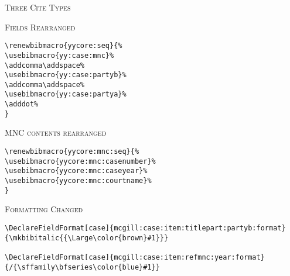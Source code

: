 %
%


\bigskip\textsc{Three Cite Types}




\bigskip\textsc{Fields Rearranged}


\begin{verbatim}
\renewbibmacro{yycore:seq}{%
\usebibmacro{yy:case:mnc}%
\addcomma\addspace%
\usebibmacro{yy:case:partyb}%
\addcomma\addspace%
\usebibmacro{yy:case:partya}%
\adddot%
}
\end{verbatim}

\bigskip\textsc{MNC contents rearranged}




\begin{verbatim}
\renewbibmacro{yycore:mnc:seq}{%
\usebibmacro{yycore:mnc:casenumber}%
\usebibmacro{yycore:mnc:caseyear}%
\usebibmacro{yycore:mnc:courtname}%
}
\end{verbatim}

\bigskip\textsc{Formatting Changed}



\begin{verbatim}
\DeclareFieldFormat[case]{mcgill:case:item:titlepart:partyb:format}
{\mkbibitalic{{\Large\color{brown}#1}}}

\DeclareFieldFormat[case]{mcgill:case:item:refmnc:year:format}
{/{\sffamily\bfseries\color{blue}#1}}
\end{verbatim}

